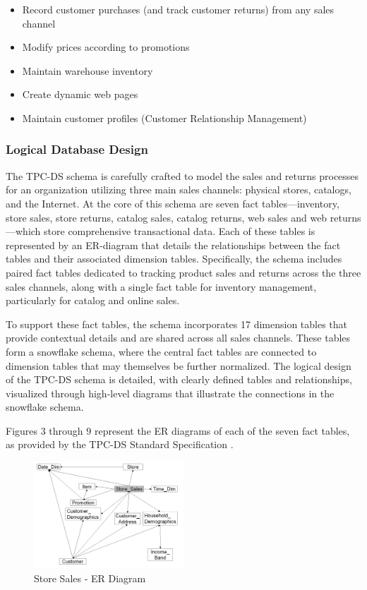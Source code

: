 \documentclass[conference]{IEEEtran}
\begin{document}
\begin{itemize}
	\item \textbf{} Record customer purchases (and track customer returns) from any sales channel
	\item \textbf{} Modify prices according to promotions
	\item \textbf{} Maintain warehouse inventory
	\item \textbf{} Create dynamic web pages
	\item \textbf{} Maintain customer profiles (Customer Relationship Management)
\end{itemize}

\subsubsection{Logical Database Design}

The TPC-DS schema is carefully crafted to model the sales and returns processes for an organization utilizing three main sales channels:
physical stores, catalogs, and the Internet. At the core of this schema are seven fact tables—inventory, store sales, store returns,
catalog sales, catalog returns, web sales and web returns—which store comprehensive transactional data. Each of these tables is represented
by an ER-diagram that details the relationships between the fact tables and their associated dimension tables. Specifically, the schema
includes paired fact tables dedicated to tracking product sales and returns across the three sales channels, along with a single fact table
for inventory management, particularly for catalog and online sales.

To support these fact tables, the schema incorporates 17 dimension tables that provide contextual details and are shared across all sales channels.
These tables form a snowflake schema, where the central fact tables are connected to dimension tables that may themselves be further normalized.
The logical design of the TPC-DS schema is detailed, with clearly defined tables and relationships, visualized through high-level diagrams that
illustrate the connections in the snowflake schema.

Figures 3 through 9 represent the ER diagrams of each of the seven fact tables, as provided by the TPC-DS Standard Specification \cite{b10}.

\begin{figure}[h]
	\centering
	\includegraphics[width=0.5\textwidth]{images/ER_Diagrams/Store Sales - ER Diagram.png}
	\caption{Store Sales - ER Diagram}
	\label{fig:store_sales_er_diagram}
\end{figure}
\end{document}
